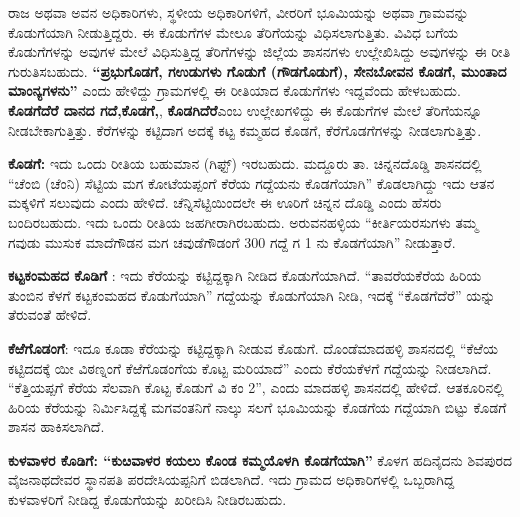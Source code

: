 ರಾಜ ಅಥವಾ ಅವನ ಅಧಿಕಾರಿಗಳು, ಸ್ಥಳೀಯ ಅಧಿಕಾರಿಗಳಿಗೆ, ವೀರರಿಗೆ ಭೂಮಿಯನ್ನು ಅಥವಾ ಗ್ರಾಮವನ್ನು ಕೊಡುಗೆಯಾಗಿ ನೀಡುತ್ತಿದ್ದರು. ಈ ಕೊಡುಗೆಗಳ ಮೇಲೂ ತೆರಿಗೆಯನ್ನು ವಿಧಿಸಲಾಗುತ್ತಿತು. ವಿವಿಧ ಬಗೆಯ ಕೊಡುಗೆಗಳನ್ನು ಅವುಗಳ ಮೇಲೆ ವಿಧಿಸುತ್ತಿದ್ದ ತೆರಿಗೆಗಳನ್ನು ಜಿಲ್ಲೆಯ ಶಾಸನಗಳು ಉಲ್ಲೇಖಿಸಿದ್ದು ಅವುಗಳನ್ನು ಈ ರೀತಿ ಗುರುತಿಸಬಹುದು. \textbf{“ಪ್ರಭುಗೊಡಗೆ, ಗಉಡುಗಳು ಗೊಡುಗೆ (ಗೌಡಗೊಡುಗೆ), ಸೇನಬೋವನ ಕೊಡಗೆ, ಮುಂತಾದ ಮಾಂನ್ಯಗಳನು”} ಎಂದು ಹೇಳಿದ್ದು ಗ್ರಾಮಗಳಲ್ಲಿ ಈ ರೀತಿಯಾದ ಕೊಡುಗೆಗಳು ಇದ್ದವೆಂದು ಹೇಳಬಹುದು. \textbf{ಕೊಡಗೆದೆರೆ ದಾನದ ಗದೆ,}\textbf{ಕೊಡಗೆ,}, \textbf{ಕೊಡಗಿದೆರೆ}ಎಂಬ ಉಲ್ಲೇಖಗಳಿದ್ದು ಈ ಕೊಡುಗೆಗಳ ಮೇಲೆ ತೆರಿಗೆಯನ್ನೂ ನೀಡಬೇಕಾಗುತ್ತಿತ್ತು. ಕೆರೆಗಳನ್ನು ಕಟ್ಟಿದಾಗ ಅದಕ್ಕೆ ಕಟ್ಟ ಕಮ್ಮಹದ ಕೊಡಗೆ, ಕೆರೆಗೊಡಗೆಗಳನ್ನು ನೀಡಲಾಗುತ್ತಿತ್ತು.

\textbf{ಕೊಡಗೆ:} ಇದು ಒಂದು ರೀತಿಯ ಬಹುಮಾನ (ಗಿಫ್ಟ್​) ಇರಬಹುದು. ಮದ್ದೂರು ತಾ. ಚಿನ್ನನದೊಡ್ಡಿ ಶಾಸನದಲ್ಲಿ “ಚೆಂಬಿ (ಚೆಂನಿ) ಸೆಟ್ಟಿಯ ಮಗ ಕೋಟೆಯಪ್ಪಂಗೆ ಕೆರೆಯ ಗದ್ದೆಯನು ಕೊಡಗೆಯಾಗಿ” ಕೊಡಲಾಗಿದ್ದು ಇದು ಆತನ ಮಕ್ಕಳಿಗೆ ಸಲುವುದು ಎಂದು ಹೇಳಿದೆ. ಚೆನ್ನಿಸೆಟ್ಟಿಯಿಂದಲೇ ಈ ಊರಿಗೆ ಚಿನ್ನನ ದೊಡ್ಡಿ ಎಂದು ಹೆಸರು ಬಂದಿರಬಹುದು. ಇದು ಒಂದು ರೀತಿಯ ಜಹಗೀರಾಗಿರಬಹುದು. ಅರುವನಹಳ್ಳಿಯ “ಕೀರ್ತಿಯರಸುಗಳು ತಮ್ಮ ಗವುಡು ಮುಸುಕ ಮಾದೆಗೌಡನ ಮಗ ಚವುಡೆಗೌಡಂಗೆ 300 ಗದ್ದೆ ಗ 1 ನು ಕೊಡಗೆಯಾಗಿ” ನೀಡುತ್ತಾರೆ.

\textbf{ಕಟ್ಟಕಂಮಹದ ಕೊಡಿಗೆ} : ಇದು ಕೆರೆಯನ್ನು ಕಟ್ಟಿದ್ದಕ್ಕಾಗಿ ನೀಡಿದ ಕೊಡುಗೆಯಾಗಿದೆ. “ತಾವರೆಯಕೆರೆಯ ಹಿರಿಯ ತುಂಬಿನ ಕೆಳಗೆ ಕಟ್ಟಕಂಮಹದ ಕೊಡುಗೆಯಾಗಿ” ಗದ್ದೆಯನ್ನು ಕೊಡುಗೆಯಾಗಿ ನೀಡಿ, ಇದಕ್ಕೆ “ಕೊಡಗೆದೆರೆ” ಯನ್ನು ತೆರುವಂತೆ ಹೇಳಿದೆ.

\textbf{ಕೆಱೆಗೊಡಂಗೆ}: ಇದೂ ಕೂಡಾ ಕೆರೆಯನ್ನು ಕಟ್ಟಿದ್ದಕ್ಕಾಗಿ ನೀಡುವ ಕೊಡುಗೆ. ದೊಂಡೆಮಾದಹಳ್ಳಿ ಶಾಸನದಲ್ಲಿ “ಕೆಱೆಯ ಕಟ್ಟಿದದಕ್ಕೆ ಯೀ ವಿಠಣ್ನಂಗೆ ಕೆಱೆಗೊಡಂಗೆಯ ಕೊಟ್ಟ ಮರಿಯಾದೆ” ಎಂದು ಕೆರೆಯಕೆಳಗೆ ಗದ್ದೆಯನ್ನು ನೀಡಲಾಗಿದೆ. “ಕೆತ್ತಿಯಪ್ಪಗೆ ಕೆರೆಯ ಸೆಲವಾಗಿ ಕೊಟ್ಟ ಕೊಡುಗೆ ವಿ ಕಂ 2”, ಎಂದು ಮಾದಹಳ್ಳಿ ಶಾಸನದಲ್ಲಿ ಹೇಳಿದೆ. ಆತಕೂರಿನಲ್ಲಿ ಹಿರಿಯ ಕೆರೆಯನ್ನು ನಿರ್ಮಿಸಿದ್ದಕ್ಕೆ ಮಗವಂತನಿಗೆ ನಾಲ್ಕು ಸಲಗೆ ಭೂಮಿಯನ್ನು ಕೊಡಗೆಯ ಗದ್ದೆಯಾಗಿ ಬಿಟ್ಟು ಕೊಡಗೆ ಶಾಸನ ಹಾಕಿಸಲಾಗಿದೆ.

\textbf{ಕುಳವಾಳರ ಕೊಡಿಗೆ: “ಕುೞವಾಳರ ಕಯಲು ಕೊಂಡ ಕಮ್ಮಯೊಳಗಿ ಕೊಡಗೆಯಾಗಿ”} ಕೊಳಗ ಹದಿನೈದನು ಶಿವಪುರದ ವೈಜನಾಥದೇವರ ಸ್ಥಾನಪತಿ ಪರದೇಸಿಯಪ್ಪನಿಗೆ ಬಿಡಲಾಗಿದೆ. ಇದು ಗ್ರಾಮದ ಅಧಿಕಾರಿಗಳಲ್ಲಿ ಒಬ್ಬರಾಗಿದ್ದ ಕುಳವಾಳರಿಗೆ ನೀಡಿದ್ದ ಕೊಡುಗೆಯನ್ನು ಖರೀದಿಸಿ ನೀಡಿರಬಹುದು.

